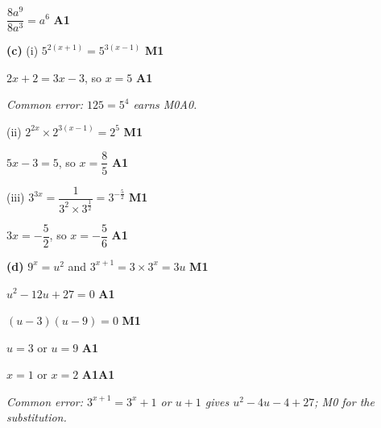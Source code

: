 \documentclass[12pt, twoside]{article}
\begin{document}
\begin{enumerate}[itemsep=0.3cm]
$\dfrac{8a^{9}}{8a^{3}} = a^{6}$ \hfill \textbf{A1}

\textbf{(c)} (i) $5^{2(x + 1)} = 5^{3(x - 1)}$ \hfill \textbf{M1}

$2x + 2 = 3x - 3$, so $x = 5$ \hfill \textbf{A1}

\emph{Common error: $125 = 5^{4}$ earns M0A0.}

(ii) $2^{2x} \times 2^{3(x - 1)} = 2^{5}$ \hfill \textbf{M1}

$5x - 3 = 5$, so $x = \dfrac{8}{5}$ \hfill \textbf{A1}

(iii) $3^{3x} = \dfrac{1}{3^{2} \times 3^{\frac{1}{2}}} = 3^{-\frac{5}{2}}$
\hfill \textbf{M1}

$3x = -\dfrac{5}{2}$, so $x = -\dfrac{5}{6}$ \hfill \textbf{A1}

\textbf{(d)} $9^{x} = u^{2}$ and $3^{x + 1} = 3 \times 3^{x} = 3u$
\hfill \textbf{M1}

$u^{2} - 12u + 27 = 0$ \hfill \textbf{A1}

$(u - 3)(u - 9) = 0$ \hfill \textbf{M1}

$u = 3$ or $u = 9$ \hfill \textbf{A1}

$x = 1$ or $x = 2$ \hfill \textbf{A1A1}

\emph{Common error: $3^{x + 1} = 3^{x} + 1$ or $u + 1$ gives
$u^{2} - 4u - 4 + 27$; M0 for the substitution.}

\end{enumerate}
\end{document}
